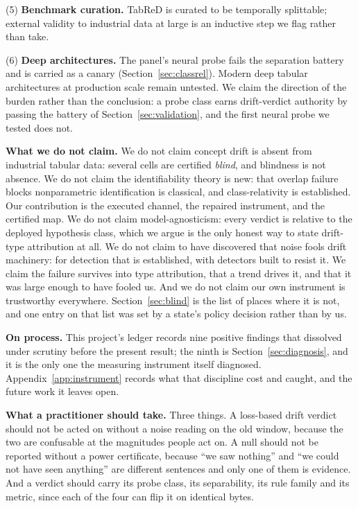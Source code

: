 \documentclass[10pt]{article} %
\begin{document}
(5) \textbf{Benchmark curation.} TabReD is curated to be temporally splittable; external validity to
industrial data at large is an inductive step we flag rather than take.

(6) \textbf{Deep architectures.} The panel's neural probe fails the separation battery and is carried as
a canary (Section~\ref{sec:classrel}). Modern deep tabular architectures at production scale remain untested. We claim
the direction of the burden rather than the conclusion: a probe class earns drift-verdict authority
by passing the battery of Section~\ref{sec:validation}, and the first neural probe we tested does not.

\textbf{What we do not claim.} We do not claim concept drift is absent from industrial tabular data:
several cells are certified \emph{blind}, and blindness is not absence. We do not claim the
identifiability theory is new: that overlap failure blocks nonparametric identification is
classical, and class-relativity is established. Our contribution is the executed channel, the
repaired instrument, and the certified map. We do not claim model-agnosticism: every verdict is
relative to the deployed hypothesis class, which we argue is the only honest way to state
drift-type attribution at all. We do not claim to have discovered that noise fools drift
machinery: for detection that is established, with detectors built to resist it. We claim the
failure survives into type attribution, that a trend drives it, and that it was large enough to
have fooled us. And
we do not claim our own instrument is trustworthy everywhere. Section~\ref{sec:blind} is the list of places where it is
not, and one entry on that list was set by a state's policy decision rather than by us.

\textbf{On process.} This project's ledger records nine positive findings that dissolved under
scrutiny before the present result; the ninth is Section~\ref{sec:diagnosis}, and it is the only one
the measuring instrument itself diagnosed. Appendix~\ref{app:instrument} records what that discipline
cost and caught, and the future work it leaves open.

\textbf{What a practitioner should take.} Three things. A loss-based drift verdict should not be acted
on without a noise reading on the old window, because the two are confusable at the magnitudes
people act on. A null should not be reported without a power certificate, because ``we saw nothing''
and ``we could not have seen anything'' are different sentences and only one of them is evidence.
And a verdict should carry its probe class, its separability, its rule family and its metric, since
each of the four can flip it on identical bytes.
\end{document}
